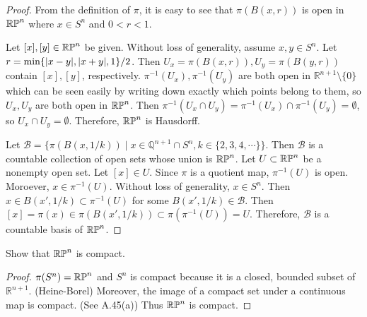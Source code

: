 \begin{proof}
  From the definition of $\pi$, it is easy to see that $\pi(B(x, r))$ is open in $\operatorname{\mathbb{R}\mathbb{P}}^n$ where $x \in S^n$ and $0 < r < 1$.

  Let $[x], [y] \in \operatorname{\mathbb{R}\mathbb{P}}^n$ be given.
  Without loss of generality, assume $x, y \in S^{n}$.
  Let $r = \min\{ \abs{x - y}, \abs{x + y}, 1 \} / 2$.
  Then $U_x = \pi(B(x, r)), U_y = \pi(B(y, r))$ contain $[x], [y]$, respectively.
  $\pi^{-1}(U_x), \pi^{-1}(U_y)$ are both open in $\mathbb{R}^{n + 1} \setminus \{ 0 \}$ which can be seen easily by writing down exactly which points belong to them, so $U_x, U_y$ are both open in $\operatorname{\mathbb{R}\mathbb{P}}^n$.
  Then $\pi^{-1}(U_x \cap U_y) = \pi^{-1}(U_x) \cap \pi^{-1}(U_y) = \emptyset$, so $U_x \cap U_y = \emptyset$.
  Therefore, $\operatorname{\mathbb{R}\mathbb{P}}^n$ is Hausdorff.

  Let $\mathcal{B} = \{ \pi(B(x, 1 / k)) \mid x \in \mathbb{Q}^{n + 1} \cap S^{n}, k \in \{ 2, 3, 4, \cdots \} \}$.
  Then $\mathcal{B}$ is a countable collection of open sets whose union is $\operatorname{\mathbb{R}\mathbb{P}}^n$.
  Let $U \subset \operatorname{\mathbb{R}\mathbb{P}}^n$ be a nonempty open set.
  Let $[x] \in U$.
  Since $\pi$ is a quotient map, $\pi^{-1}(U)$ is open.
  Moroever, $x \in \pi^{-1}(U)$.
  Without loss of generality, $x \in S^{n}$.
  Then $x \in B(x', 1 / k) \subset \pi^{-1}(U)$ for some $B(x', 1 / k) \in \mathcal{B}$.
  Then $[x] = \pi(x) \in \pi(B(x', 1 / k)) \subset \pi(\pi^{-1}(U)) = U$.
  Therefore, $\mathcal{B}$ is a countable basis of $\operatorname{\mathbb{R}\mathbb{P}}^n$.
\end{proof}

\begin{customexer}{1.7}
  Show that $\operatorname{\mathbb{R}\mathbb{P}}^n$ is compact.
\end{customexer}

\begin{proof}
  $\pi(S^n) = \operatorname{\mathbb{R}\mathbb{P}}^n$ and $S^n$ is compact because it is a closed, bounded subset of $\mathbb{R}^{n + 1}$. (Heine-Borel)
  Moreover, the image of a compact set under a continuous map is compact. (See A.45(a))
  Thus $\operatorname{\mathbb{R}\mathbb{P}}^n$ is compact.
\end{proof}
